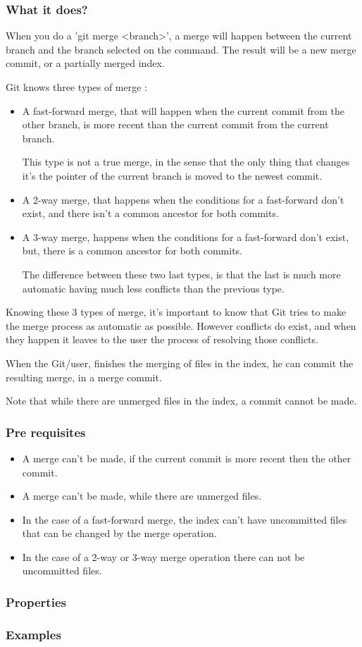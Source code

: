 \subsubsection{What it does?}

When you do a 'git merge <branch>', a merge will happen between the current
branch and the branch selected on the command. The result will be a new merge 
commit, or a partially merged index. \par

Git knows three types of merge : 
\begin{itemize}
\item A fast-forward merge, that will happen when 
the current commit from the other
branch, is more recent than the current commit from the current branch. \par
This type is not a true merge, in the sense that the only thing that
changes it's the pointer of the current branch
is moved to the newest commit.

\item A 2-way merge, that happens when the conditions for a fast-forward
don't exist, and there isn't a common ancestor for both commits.

\item A 3-way merge, happens when the conditions for a fast-forward
don't exist, but, there is a common ancestor for both commits. \par
The difference between these two last types, is that the last is much 
more automatic having much less conflicts than the previous type.
\end{itemize}
Knowing these 3 types of merge, it's important to know that Git tries to make
the merge process as automatic as possible. However conflicts do exist, and when
they happen it leaves to the user the process of resolving those conflicts. \par
When the Git/user, finishes the merging of files in the index, he
can commit the resulting merge, in a merge commit. \par
Note that while there are unmerged files in the index, a commit cannot be
made. \par 

\subsubsection{Pre requisites}

\begin{itemize}
\item A merge can't be made, if the current commit is more recent then the
other commit.
\item A merge can't be made, while there are unmerged files.
\item In the case of a fast-forward merge, the index can't have uncommitted
files that can be changed by the merge operation.
\item In the case of a 2-way or 3-way merge operation there can not be
uncommitted files. 
\end{itemize}

\subsubsection{Properties}

\subsubsection{Examples}

